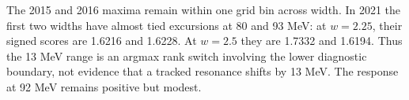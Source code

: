 The 2015 and 2016 maxima remain within one grid bin across width. In 2021 the first two widths have almost tied excursions at 80 and 93 MeV: at $w=2.25$, their signed scores are 1.6216 and 1.6228. At $w=2.5$ they are 1.7332 and 1.6194. Thus the 13 MeV range is an argmax rank switch involving the lower diagnostic boundary, not evidence that a tracked resonance shifts by 13 MeV. The response at 92 MeV remains positive but modest.
